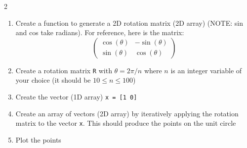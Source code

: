 \documentclass[12pt]{article}%
\newcommand{\code}[1]{\texttt{#1}}
\begin{document}
\begin{multicols*}{2}
\begin{Exercise}[origin={20 points, Python}]
\begin{enumerate}[leftmargin=*]
	\item Create a function to generate a 2D rotation matrix (2D array) (NOTE: sin and cos take radians). For reference, here is the matrix:
	\begin{equation*}
		\begin{pmatrix}
			\cos(\theta) & -\sin(\theta) \\
			\sin(\theta) & \cos(\theta)
		\end{pmatrix}
	\end{equation*}
	\item Create a rotation matrix \code{R} with $\theta=2\pi/n$ where $n$ is an integer variable of your choice (it should be $10\le n \le 100$)
	\item Create the vector (1D array) \code{x = [1 0]}
	\item Create an array of vectors (2D array) by iteratively applying the rotation matrix to the vector \code{x}. This should produce the points on the unit circle
	\item Plot the points
\end{enumerate}

\end{Exercise}












\vfill\null

\end{multicols*}
\end{document}
